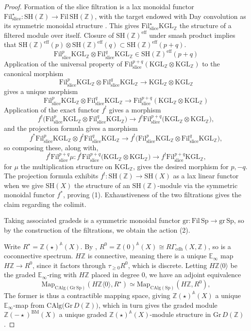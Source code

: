 \documentclass[11pt, twoside]{article}
\numberwithin{equation}{section}
\theoremstyle{definition}
\newcommand{\bb}[1]{\mathbb{#1}}
\newcommand{\fil}{\mathrm{Fil}}
\newcommand{\gr}{\mathrm{gr}}
\newcommand{\Kgl}{\mathrm{KGL}}
\newcommand{\sh}{\mathrm{SH}}
\newcommand{\Sp}{\mathrm{Sp}}
\newcommand{\bm}{\mathrm{BM}}
\newcommand{\sli}{\mathrm{slice}}
\newcommand{\Map}{\mathrm{Map}}
\begin{document}
\begin{proof}
Formation of the slice filtration is a lax monoidal functor \(\fil_\sli^\star \colon \sh(\bb{Z}) \to \fil \, \sh(\bb{Z})\), with the target endowed with Day convolution as its symmetric monoidal structure \cite[\S 13.4]{BH}. This gives \(\fil_\sli^\star \Kgl_\bb{Z}\) the structure of a filtered module over itself. Closure of \(\sh(\bb{Z})^\mathrm{eff}\) under smash product implies that \(\sh(\bb{Z})^\mathrm{eff}(p) \otimes \sh(\bb{Z})^\mathrm{eff}(q) \subset \sh(\bb{Z})^\mathrm{eff}(p + q)\).
\[\fil_\sli^p \Kgl_\bb{Z} \otimes \fil_\sli^q \Kgl_\bb{Z} \in \sh(\bb{Z})^\mathrm{eff}(p + q)\]
Application of the universal property of \(\fil_\sli^{p + q}(\Kgl_\bb{Z} \otimes \Kgl_\bb{Z})\) to the canonical morphism 
\[\fil_\sli^p \Kgl_\bb{Z} \otimes \fil_\sli^q \Kgl_\bb{Z} \to \Kgl_\bb{Z} \otimes \Kgl_\bb{Z}\]
gives a unique morphism 
\[\fil_\sli^p \Kgl_\bb{Z} \otimes \fil_\sli^q \Kgl_\bb{Z} \to \fil_\sli^{p + q}(\Kgl_\bb{Z} \otimes \Kgl_\bb{Z})\]
Application of the exact functor \(f^!\) gives a morphism 
\[f^!\big(\fil_\sli^p \Kgl_\bb{Z} \otimes \fil_\sli^q \Kgl_\bb{Z}\big) \to f^! \fil_\sli^{p + q}\big(\Kgl_\bb{Z} \otimes \Kgl_\bb{Z}\big),\]
and the projection formula gives a morphism 
\[f^* \fil_\sli^p \Kgl_\bb{Z} \otimes f^! \fil_\sli^q \Kgl_\bb{Z} \to f^! \big(\fil_\sli^p \Kgl_\bb{Z} \otimes \fil_\sli^q \Kgl_\bb{Z}\big),\]
so composing these, along with, 
\[f^! \fil_\sli^{p + q}\mu \colon f^! \fil_\sli^{p + q} \big(\Kgl_\bb{Z} \otimes \Kgl_\bb{Z}\big) \to f^! \fil_\sli^{p + q}\Kgl_\bb{Z},\]
for \(\mu\) the multiplication structure on \(\Kgl_\bb{Z}\), gives the desired morphism for \(p, - q\). The projection formula exhibits \(f^! \colon \sh(\bb{Z}) \to \sh(X)\) as a lax linear functor when we give \(\sh(X)\) the structure of an \(\sh(\bb{Z})\)-module via the symmetric monoidal functor \(f^*\), proving (1). Exhaustiveness of the two filtrations gives the claim regarding the colimit.

Taking associated gradeds is a symmetric monoidal functor \(\gr \colon \fil \, \Sp \to \gr \, \Sp\), so by the construction of the filtrations, we obtain the action (2).

Write \(R^\star = \bb{Z}(\star)^\bb{A}(X)\). By \cite[Corollary 9.12 (1)]{BEM}, \(R^0 = \bb{Z}(0)^\bb{A}(X) \cong R\Gamma_\mathrm{cdh}(X, \bb{Z})\), so is a coconnective spectrum. \(H\bb{Z}\) is connective, meaning there is a unique \(\bb{E}_\infty\) map \(H\bb{Z} \to R^0\), since it factors through \(\tau_{\geq 0} R^0\), which is discrete. Letting \(H\bb{Z}\langle 0 \rangle\) be the graded \(\bb{E}_\infty\)-ring with \(H\bb{Z}\) placed in degree 0, we have an adjoint equivalence 
\[\Map_{\mathrm{CAlg}(\mathrm{Gr} \, \Sp)} (H\bb{Z}\langle 0 \rangle, R^\star) \simeq \Map_{\mathrm{CAlg}(\Sp)}(H\bb{Z}, R^0),\]
The former is thus a contractible mapping space, giving \(\bb{Z}(\star)^\bb{A}(X)\) a unique \(\bb{E}_\infty\)-map from \(\mathrm{CAlg}\big(\mathrm{Gr} \, D(\bb{Z})\big)\), which in turn gives the graded module \(\bb{Z}(- \star)^\bm(X)\) a unique graded \(\bb{Z}(\star)^\bb{A}(X)\)-module structure in \(\mathrm{Gr} \, D(\bb{Z})\).
\end{proof}
\end{document}
